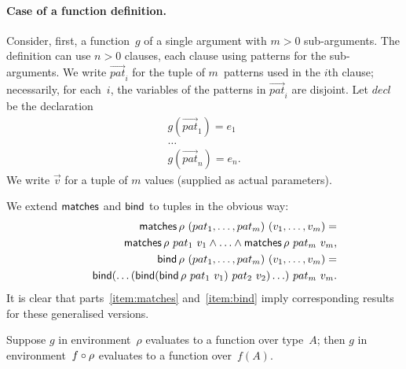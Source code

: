 
\paragraph{Case of a function definition.}

Consider, first, a function~$g$ of a single argument with $m>0$ sub-arguments.
The definition can use $n>0$ clauses, each clause using patterns for the
sub-arguments.  We write $\vec{pat}_i$ for the tuple of $m$~patterns used in
the $i$th clause; necessarily, for each~$i$, the variables of the patterns in
$\vec{pat}_i$ are disjoint.  Let $decl$ be the declaration
\[
\begin{array}{c}
g(\vec{pat}_1) = e_1 \\
\ldots \\
g(\vec{pat}_n) = e_n.
\end{array}
\]
We write $\vec{v}$ for a tuple of $m$ values (supplied as actual parameters).

We extend $\mathop{\sf matches}$ and $\mathop{\sf bind}\nolimits$ to tuples in the obvious way:
\[
\begin{align}
\mathop{\sf matches} \rho~(pat_1,\ldots,pat_m)~(v_1,\ldots, v_m)  = \\
\qquad  \mathop{\sf matches} \rho~pat_1~v_1 \land \ldots \land \mathop{\sf matches} \rho~pat_m~v_m, \\
\mathop{\sf bind}\nolimits \rho~(pat_1,\ldots,pat_m)~(v_1,\ldots, v_m)  = \\
\qquad  \mathop{\sf bind}\nolimits(\ldots(\mathop{\sf bind}\nolimits (\mathop{\sf bind}\nolimits \rho~pat_1~v_1)~pat_2~v_2)\ldots)~pat_m~v_m.
\end{align}
\]
It is clear that parts~\ref{item:matches} and~\ref{item:bind} imply
corresponding results for these generalised versions.  

Suppose $g$ in environment~$\rho$ evaluates to a function over type~$A$; then
$g$ in environment~$f\circ\rho$ evaluates to a function over~$f(A)$.

